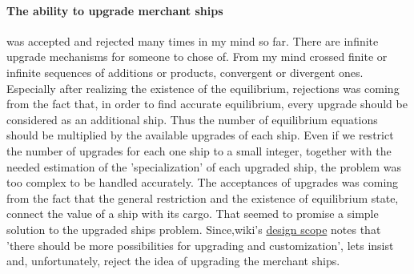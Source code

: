 \documentclass[]{article}
\begin{document}
\paragraph{The ability to upgrade merchant ships} was accepted and rejected many times in my mind so far. There are infinite upgrade mechanisms for someone to chose of. From my mind crossed finite or infinite sequences of additions or products, convergent or divergent ones. Especially after realizing the existence of the equilibrium, rejections was coming from the fact that, in order to find accurate equilibrium, every upgrade should be considered as an additional ship. Thus the number of equilibrium equations should be multiplied by the available upgrades of each ship. Even if we restrict the number of upgrades for each one ship to a small integer, together with the needed estimation of the 'specialization' of each upgraded ship, the problem was too complex to be handled accurately. The acceptances of upgrades was coming from the fact that the general restriction and the existence of equilibrium state, connect the value of a ship with its cargo. That seemed to promise a simple solution to the upgraded ships problem. Since,wiki's \hyperref{https://pioneerwiki.com/wiki/Design_Scope}{}{}{design scope} notes that \textsf{'there should be more possibilities for upgrading and customization'}, lets insist and, unfortunately, reject the idea of upgrading the merchant ships.
\end{document}
